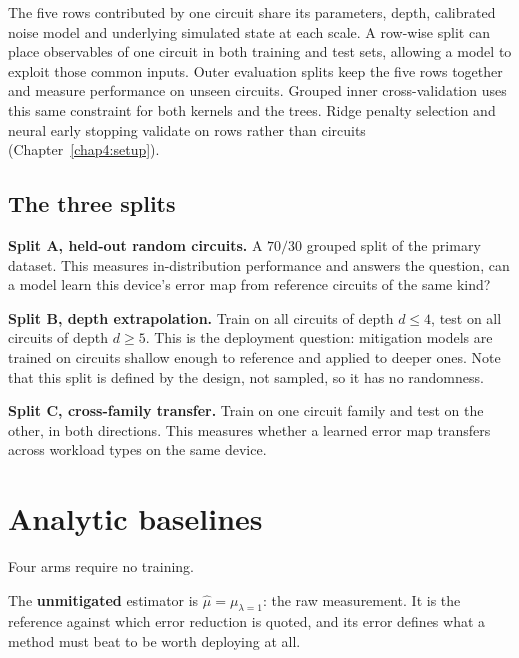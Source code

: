 \documentclass[Thesis.tex]{subfiles}
\begin{document}
The five rows contributed by one circuit share its parameters, depth,
calibrated noise model and underlying simulated state at each scale. A
row-wise split can place observables of one circuit in both training and
test sets, allowing a model to exploit those common inputs. Outer evaluation
splits keep the five rows together and measure performance on unseen
circuits. Grouped inner cross-validation uses this same
constraint for both kernels and the trees. Ridge penalty selection and neural
early stopping validate on rows rather than circuits (Chapter~\ref{chap4:setup}).

\subsection{The three splits}

\textbf{Split A, held-out random circuits.} A $70/30$ grouped split of the primary
dataset. This measures in-distribution performance and answers the question, can a
model learn this device's error map from reference circuits of the same kind?

\textbf{Split B, depth extrapolation.} Train on all circuits of depth
$d \leq 4$, test on all circuits of depth $d \geq 5$. This is the deployment
question: mitigation models are trained on circuits shallow enough to reference and
applied to deeper ones. Note that this split is defined by the design, not sampled,
so it has no randomness.

\textbf{Split C, cross-family transfer.} Train on one circuit family and test on the
other, in both directions. This measures whether a learned error map transfers
across workload types on the same device.

\section{Analytic baselines}\label{sec:ch3_analytic}

Four arms require no training.

The \textbf{unmitigated} estimator is $\widehat{\mu} = \mu_{\lambda = 1}$: the raw
measurement. It is the reference against which error reduction is quoted, and its
error defines what a method must beat to be worth deploying at all.
\end{document}
